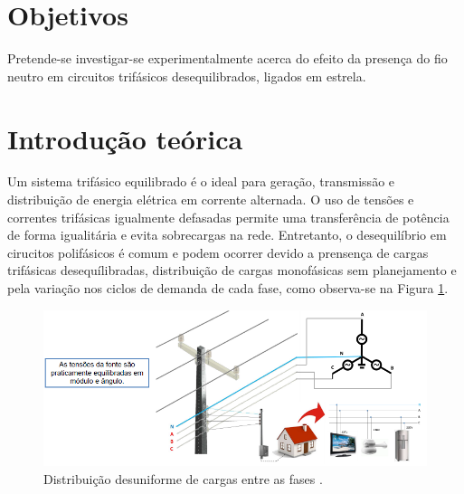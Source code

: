 \documentclass[a4paper,12pt,oneside,openany,table,xcdraw]{article}
\begin{document}
\newcommand{\thedepartment}{Faculdade de Engenharia Elétrica}
\newcommand{\thecourse}{FEELT}
\newcommand{\thetitle}{CIRCUITOS TRIFÁSICOS DESEQUILIBRADOS}
\newcommand{\thetype}{Relatório da Disciplina de Experimental de Circuitos Elétricos II}
\newcommand{\theproftitle}{Bacharel em Engenharia Elétrica}
\newcommand{\thestudent}{Lesly Viviane Montúfar Berrios\\
\centering11811ETE001}
\newcommand{\theadvisor}{Prof. Wellington Maycon Santos Bernardes}
\newcommand{\thecity}{Uberlândia}

\thispagestyle{empty}


\onehalfspacing
\tableofcontents %
\newpage

\section{Objetivos} %
Pretende-se investigar-se experimentalmente acerca do efeito da presença do fio neutro em circuitos trifásicos desequilibrados, ligados em estrela.

\section{Introdução teórica} %

Um sistema trifásico equilibrado é o ideal para geração, transmissão e distribuição de energia elétrica em corrente alternada. O uso de tensões e correntes trifásicas igualmente defasadas permite uma transferência de potência de forma igualitária e evita sobrecargas na rede. Entretanto, o desequilíbrio em cirucitos polifásicos é comum e podem ocorrer devido a prensença de cargas trifásicas desequílibradas, distribuição de cargas monofásicas sem planejamento e pela variação nos ciclos de demanda de cada fase, como observa-se na Figura \ref{intro:fig1}.

\vspace{0.3cm}
\begin{figure}[H]
\centering
\includegraphics[width=13cm]{DISTRIBUICAO-DESUNIFORME}
\caption{Distribuição desuniforme de cargas entre as fases \cite{PH}.}
\label{intro:fig1}
\end{figure}
\vspace{0.3cm}
\end{document}
